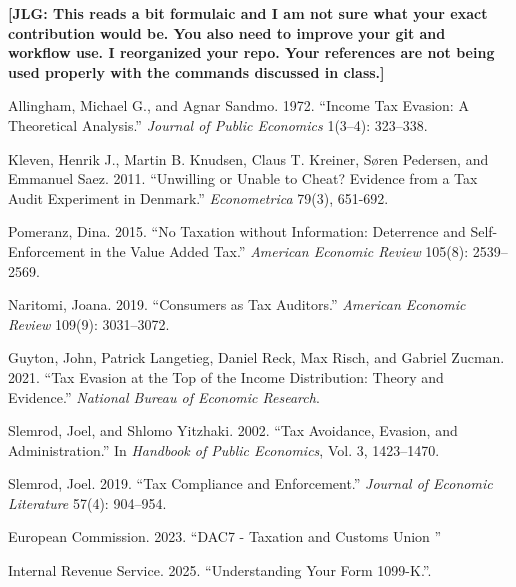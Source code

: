 \documentclass[11pt]{article}
\begin{document}
\bigskip 

\noindent \textbf{[JLG: This reads a bit formulaic and I am not sure what your exact contribution would be. You also need to improve your git and workflow use. I reorganized your repo. Your references are not being used properly with the commands discussed in class.]}

\newpage
\begin{thebibliography}{9}\small
{}
Allingham, Michael G., and Agnar Sandmo. 1972. ``Income Tax Evasion: A Theoretical Analysis.'' \textit{Journal of Public Economics} 1(3--4): 323--338.

Kleven, Henrik J., Martin B. Knudsen, Claus T. Kreiner, S\o ren Pedersen, and Emmanuel Saez. 2011. ``Unwilling or Unable to Cheat? Evidence from a Tax Audit Experiment in Denmark.'' \textit{Econometrica} 79(3), 651-692.

Pomeranz, Dina. 2015. ``No Taxation without Information: Deterrence and Self-Enforcement in the Value Added Tax.'' \textit{American Economic Review} 105(8): 2539--2569.

Naritomi, Joana. 2019. ``Consumers as Tax Auditors.'' \textit{American Economic Review} 109(9): 3031--3072.

Guyton, John, Patrick Langetieg, Daniel Reck, Max Risch, and Gabriel Zucman. 2021. ``Tax Evasion at the Top of the Income Distribution: Theory and Evidence.'' \textit{National Bureau of Economic Research}.

Slemrod, Joel, and Shlomo Yitzhaki. 2002. ``Tax Avoidance, Evasion, and Administration.'' In \textit{Handbook of Public Economics}, Vol. 3, 1423--1470.

Slemrod, Joel. 2019. ``Tax Compliance and Enforcement.'' \textit{Journal of Economic Literature} 57(4): 904--954.

European Commission. 2023. ``DAC7 - Taxation and Customs Union
'' 

Internal Revenue Service. 2025. ``Understanding Your Form 1099-K.''.

\end{thebibliography}
\end{document}
